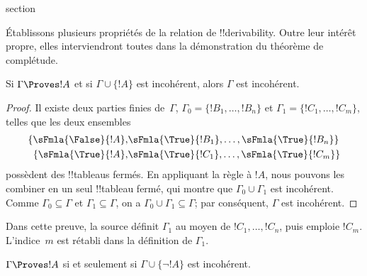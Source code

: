 \documentclass[11pt,a4paper,openany]{memoir}
\begin{document}
\endgroup



\begingroup
\expandafter\def\csname ol@sectioncs\endcsname{section}
\def\olfilename{provability-consistency}


      {}
      {}


Établissons plusieurs propriétés de la relation de !!{derivability}.
Outre leur intérêt propre, elles interviendront toutes dans la
démonstration du théorème de complétude.

\begin{prop}
  Si $\Gamma \Proves !A$ et si $\Gamma \cup \{!A\}$ est
  incohérent, alors $\Gamma$ est incohérent.
\end{prop}

\begin{proof}
Il existe deux parties finies de~$\Gamma$,
$\Gamma_0 = \{!B_1, \dots, !B_n\}$ et
$\Gamma_1 = \{!C_1, \dots, !C_m\}$, telles que les deux ensembles
  \begin{align*}
    \{\sFmla{\False}{!A}, &
    \sFmla{\True}{!B_1}, \dots, \sFmla{\True}{!B_n}\} \\
    \{\sFmla{\True}{!A}, &
    \sFmla{\True}{!C_1}, \dots, \sFmla{\True}{!C_m}\}
  \end{align*}
possèdent des !!{tableau}s fermés. En appliquant la règle \Cut{} à
$!A$, nous pouvons les combiner en un seul !!{tableau} fermé, qui
montre que $\Gamma_0 \cup \Gamma_1$ est incohérent. Comme
$\Gamma_0 \subseteq \Gamma$ et $\Gamma_1 \subseteq \Gamma$, on a
$\Gamma_0 \cup \Gamma_1 \subseteq \Gamma$; par conséquent,
$\Gamma$ est incohérent.
\end{proof}

\begin{editorial}
Dans cette preuve, la source définit $\Gamma_1$ au moyen de
$!C_1,\dots,!C_n$, puis emploie $!C_m$. L'indice~$m$ est rétabli dans
la définition de $\Gamma_1$.
\end{editorial}

\begin{prop}
$\Gamma \Proves !A$ si et seulement si
$\Gamma \cup \{\lnot !A\}$ est incohérent.
\end{prop}
\end{document}
